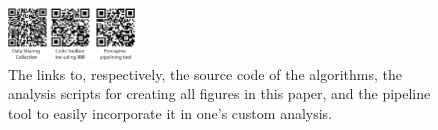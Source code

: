 \begin{figure}[!ht]
\centering
\includegraphics[width=0.3\textwidth, clip=true]{./Chapters/02_Registration/Images/./QRCodes}
\caption{The links to, respectively, the source code of the algorithms, the analysis scripts for creating all figures in this paper, and the pipeline tool to easily incorporate it in one's custom analysis.}
\label{fig:si-qrcodes}
\end{figure}